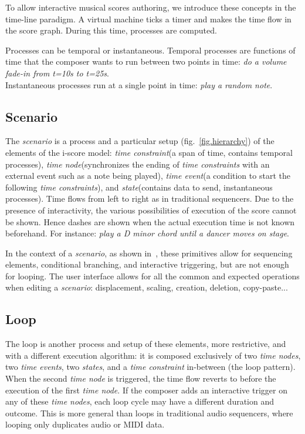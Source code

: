 \documentclass{article}
\newcommand{\scenario}{\textit{scenario}\xspace}
\newcommand{\state}{\textit{state}\xspace}
\newcommand{\states}{\textit{states}\xspace}
\newcommand{\timeevent}{\textit{time event}\xspace}
\newcommand{\timeevents}{\textit{time events}\xspace}
\newcommand{\timenode}{\textit{time node}\xspace}
\newcommand{\timenodes}{\textit{time nodes}\xspace}
\newcommand{\timeconstraint}{\textit{time constraint}\xspace}
\newcommand{\timeconstraints}{\textit{time constraints}\xspace}
\begin{document}
To allow interactive musical scores authoring, we introduce these concepts in the time-line paradigm.
A virtual machine ticks a timer and makes the time flow in the score graph. 
During this time, processes are computed.

Processes can be temporal or instantaneous.
Temporal processes are functions of time that the composer wants to run between 
two points in time: \emph{do a volume fade-in from t=10s to t=25s}.~\\
Instantaneous processes run at a single point in time: \emph{play a random note}.

\subsection{Scenario}
The \scenario is a process and a particular setup (fig.~\ref{fig.hierarchy}) of the elements of the i-score model: \timeconstraint (a span of time, contains temporal processes), \timenode (synchronizes the ending of \timeconstraints with an external event such as a note being played), \timeevent (a condition to start the following \timeconstraints ), and \state (contains data to send, instantaneous processes).
Time flows from left to right as in traditional sequencers. 
Due to the presence of interactivity, the various possibilities of execution of the score cannot be shown. 
Hence dashes are shown when the actual execution time is not known beforehand. 
For instance: \emph{play a D minor chord until a dancer moves on stage}.

In the context of a \scenario, as shown in~\cite{celerier2015ossia}, these primitives allow for sequencing elements, conditional branching, and interactive triggering, but are not enough for looping.
The user interface allows for all the common and expected operations when editing a \scenario: displacement, scaling, creation, deletion, copy-paste...

\subsection{Loop}
The loop is another process and setup of these elements, more restrictive, and with a different execution algorithm: it is 
composed exclusively of two \timenodes, two \timeevents, two \states, and a \timeconstraint in-between (the loop pattern).
When the second \timenode is triggered, the time flow reverts to before the execution of the first \timenode.
If the composer adds an interactive trigger on any of these \timenodes, each loop cycle may have a different duration and outcome.
This is more general than loops in traditional audio sequencers, where looping only duplicates audio or MIDI data.
\end{document}
